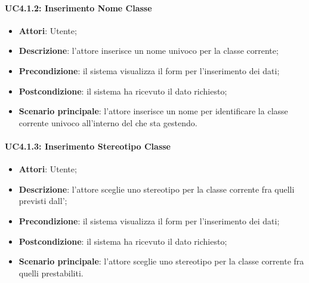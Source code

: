 \paragraph{UC4.1.2: Inserimento Nome Classe}
\label{UC4.1.2}
\begin{itemize}
\item \textbf{Attori}: Utente;
\item \textbf{Descrizione}: l'attore inserisce un nome univoco per la classe corrente;
\item \textbf{Precondizione}: il sistema visualizza il form per l'inserimento dei dati;
\item \textbf{Postcondizione}: il sistema ha ricevuto il dato richiesto;
\item \textbf{Scenario principale}:
l'attore inserisce un nome per identificare la classe corrente univoco all'interno del  che sta gestendo.
\end{itemize}

\paragraph{UC4.1.3: Inserimento Stereotipo Classe}
\label{UC4.1.3}
\begin{itemize}
\item \textbf{Attori}: Utente;
\item \textbf{Descrizione}: l'attore sceglie uno stereotipo per la classe corrente fra quelli previsti dall';
\item \textbf{Precondizione}: il sistema visualizza il form per l'inserimento dei dati;
\item \textbf{Postcondizione}: il sistema ha ricevuto il dato richiesto;
\item \textbf{Scenario principale}:
l'attore sceglie uno stereotipo per la classe corrente fra quelli prestabiliti.
\end{itemize}

